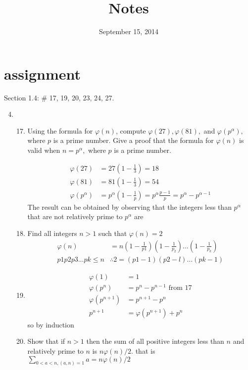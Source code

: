 \documentclass[letterpaper]{article}
\begin{document}
\title{Notes}
\date{September 15, 2014}
\maketitle
\section*{assignment}
Section 1.4: \# 17, 19, 20, 23, 24, 27. 
\renewcommand{\labelenumi}{1.\arabic{enumi}}
\renewcommand{\labelenumii}{\arabic{enumii}.}
\renewcommand{\labelenumiii}{(\alph{enumiii})}
\begin{enumerate}
\setcounter{enumi}{3}
\item
  \begin{enumerate}
  \setcounter{enumii}{16}
  \item
  Using the formula for $\varphi(n)$, compute $\varphi(27),\varphi(81),$ and $\varphi(p^\alpha),$ where $p$ is a prime number. Give a proof that the formula for $\varphi(n)$ is valid when $n=p^{\alpha},$ where $p$ is a prime number.

  \begin{align*}
    \varphi(27)&=27(1-\frac{1}{3})=18\\
    \varphi(81)&=81(1-\frac{1}{3})=54\\
    \varphi(p^{\alpha})&=p^{\alpha}(1-\frac{1}{p})=p^{\alpha}\frac{p-1}{p}=p^{\alpha}-p^{\alpha-1}
  \end{align*}
  The result can be obtained by observing that the integers less than $p^{\alpha}$ that are not relatively prime to $p^{\alpha}$ are
  \setcounter{enumii}{18}
  \item
  Find all integers $n>1$ such that $\varphi(n)=2$
  \begin{align*}
    \varphi(n)&=n(1-\frac{1}{p1})(1-\frac{1}{p_2})\dots(1-\frac{1}{p_k})\\
    p1p2p3...pk\le n&\therefore2=(p1-1)(p2-l)\dots(pk-1)
  \end{align*}
  \setcounter{enumii}{19}
  \item
  \begin{align*}
    \varphi(1)&=1\\
    \varphi(p^n)&=p^n-p^{n-1}\text{ from 17}\\
    \varphi(p^{n+1})&=p^{n+1}-p^{n}\\
    p^{n+1}&=\varphi(p^{n+1})+p^n
  \end{align*}
  so by induction
  \setcounter{enumii}{22}
  \item
  Show that if $n>1$ then the sum of all positive integers less than $n$ and relatively prime to $n$ is $n\varphi(n)/2$. that is $\sum\limits_{0<a<n,(a,n)=1}{a}=n\varphi(n)/2$


\end{enumerate}
\end{enumerate}
\end{document}
